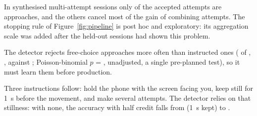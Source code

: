 In synthesised multi-attempt sessions only  of the accepted attempts are approaches, and the
others cancel most of the gain of combining attempts. The stopping rule of Figure~\ref{fig:pipeline} is post hoc and
exploratory: its aggregation scale was added after the held-out sessions had shown this problem.

The detector rejects free-choice approaches more often than instructed ones ( of
, , against ; Poisson-binomial
$p$ = , unadjusted, a single pre-planned test), so it must learn them before production.

Three instructions follow: hold the phone with the screen facing you, keep still for 1~s before the movement, and
make several attempts. The detector relies on that stillness: with none, the accuracy with half credit falls from
 (1~s kept) to .
